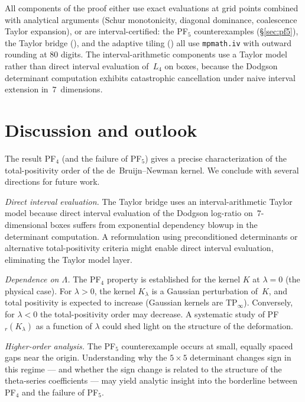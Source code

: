 \documentclass[11pt,a4paper]{amsart}
\theoremstyle{definition}
\theoremstyle{remark}
\begin{document}
All components of the proof either use exact evaluations at grid
points combined with analytical arguments (Schur monotonicity,
diagonal dominance, coalescence Taylor expansion), or are
interval-certified: the PF$_5$ counterexamples (\S\ref{sec:pf5}),
the Taylor bridge (), and the adaptive tiling
() all use
\texttt{mpmath.iv} with outward rounding at $80$ digits.
The interval-arithmetic components use a Taylor model
rather than direct interval evaluation of~$L_4$ on boxes,
because the Dodgson determinant computation exhibits
catastrophic cancellation under naive interval extension
in~$7$~dimensions.


\section{Discussion and outlook}\label{sec:discussion}

The result PF$_4$ (and the failure of PF$_5$) gives a precise
characterization of the total-positivity order of the
de~Bruijn--Newman kernel.
We conclude with several directions for future work.

\emph{Direct interval evaluation.}
The Taylor bridge uses an interval-arithmetic Taylor model
because direct interval evaluation of the Dodgson log-ratio
on~$7$-dimensional boxes suffers from exponential dependency
blowup in the determinant computation.
A reformulation using preconditioned determinants or
alternative total-positivity criteria might enable direct
interval evaluation, eliminating the Taylor model layer.

\emph{Dependence on $\Lambda$.}
The PF$_4$ property is established for the kernel $K$ at
$\lambda = 0$ (the physical case).
For $\lambda > 0$, the kernel $K_\lambda$ is a Gaussian
perturbation of~$K$, and total positivity is expected to
increase (Gaussian kernels are TP$_\infty$).
Conversely, for $\lambda < 0$ the total-positivity order may decrease.
A systematic study of PF$_r(K_\lambda)$ as a function of $\lambda$
could shed light on the structure of the deformation.

\emph{Higher-order analysis.}
The PF$_5$ counterexample occurs at small, equally spaced gaps
near the origin.
Understanding why the $5\times 5$ determinant changes sign in
this regime --- and whether the sign change is related to
the structure of the theta-series coefficients --- may yield
analytic insight into the borderline between PF$_4$ and the
failure of PF$_5$.
\end{document}
